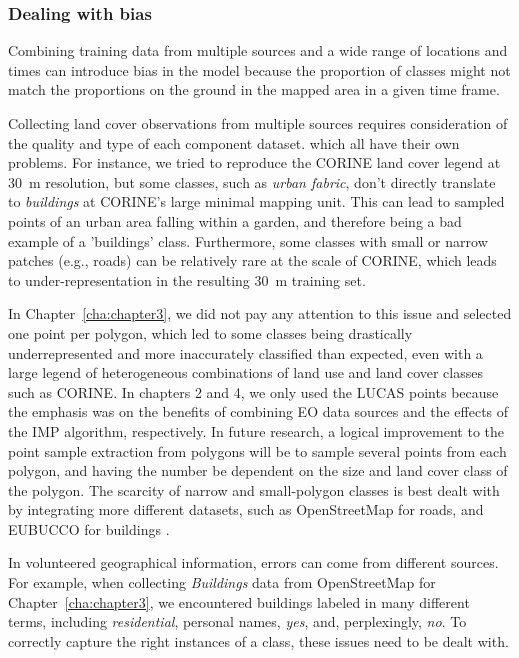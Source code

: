         \subsubsection{Dealing with bias}
        
        Combining training data from multiple sources and a wide range of locations and times can introduce bias in the model because the proportion of classes might not match the proportions on the ground in the mapped area in a given time frame. 
        
        Collecting land cover observations from multiple sources requires consideration of the quality and type of each component dataset. which all have their own problems. For instance, we tried to reproduce the CORINE land cover legend at 30~m resolution, but some classes, such as \textit{urban fabric}, don't directly translate to \textit{buildings} at CORINE's large minimal mapping unit. This can lead to sampled points of an urban area falling within a garden, and therefore being a bad example of a 'buildings' class. Furthermore, some classes with small or narrow patches (e.g., roads) can be relatively rare at the scale of CORINE, which leads to under-representation in the resulting 30~m training set. 

        In Chapter\@~\ref{cha:chapter3}, we did not pay any attention to this issue and selected one point per polygon, which led to some classes being drastically underrepresented and more inaccurately classified than expected, even with a large legend of heterogeneous combinations of land use and land cover classes such as CORINE. In chapters 2 and 4, we only used the LUCAS points because the emphasis was on the benefits of combining EO data sources and the effects of the IMP algorithm, respectively. In future research, a logical improvement to the point sample extraction from polygons will be to sample several points from each polygon, and having the number be dependent on the size and land cover class of the polygon. The scarcity of narrow and small-polygon classes is best dealt with by integrating more different datasets, such as OpenStreetMap for roads, and EUBUCCO for buildings \citep{milojevic2023eubucco}.
        
        In volunteered geographical information, errors can come from different sources. For example, when collecting \textit{Buildings} data from OpenStreetMap for Chapter\@~\ref{cha:chapter3}, we encountered buildings labeled in many different terms, including \textit{residential}, personal names, \textit{yes}, and, perplexingly, \textit{no}. To correctly capture the right instances of a class, these issues need to be dealt with.
        
